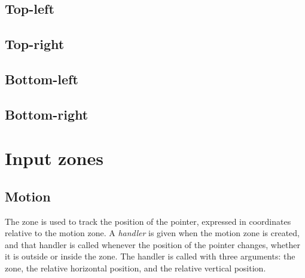\subsection{Top-left}



\subsection{Top-right}



\subsection{Bottom-left}



\subsection{Bottom-right}



\section{Input zones}
\label{sec-zones-input}

\subsection{Motion}
\label{sec-zones-input-motion}

The  zone is used to track the position of the pointer,
expressed in coordinates relative to the motion zone.  A
\emph{handler} is given when the motion zone is created, and that
handler is called whenever the position of the pointer changes,
whether it is outside or inside the zone.  The handler is called with
three arguments: the zone, the relative horizontal position, and the
relative vertical position. 


